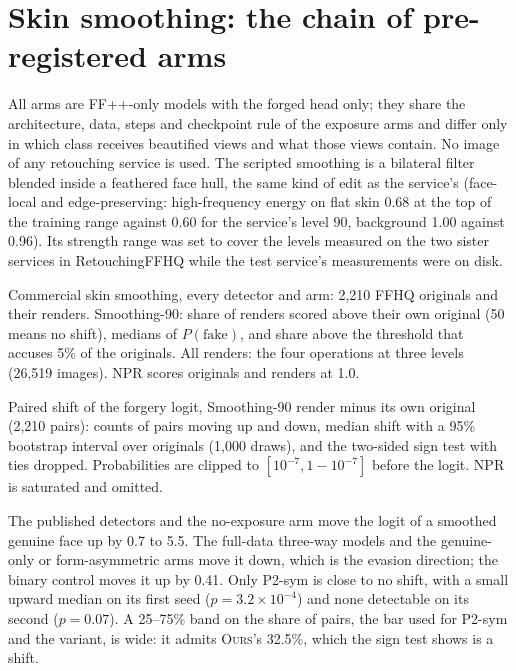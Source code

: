 \documentclass[10pt]{article}
\newcommand{\ours}{\textsc{Ours}}
\begin{document}
\section{Skin smoothing: the chain of pre-registered arms}
\label{sec:chain}
All arms are FF++-only models with the forged head only; they share the architecture, data, steps and checkpoint rule of the
exposure arms and differ only in which class receives beautified views and what those views contain. No image of any retouching
service is used. The scripted smoothing is a bilateral filter blended inside a feathered face hull, the same kind of edit as the
service's (face-local and edge-preserving: high-frequency energy on flat skin 0.68 at the top of the training range against 0.60
for the service's level 90, background 1.00 against 0.96). Its strength range was set to cover the levels measured on the two
sister services in RetouchingFFHQ while the test service's measurements were on disk.

\begin{table}[H]
\centering
\caption{Commercial skin smoothing, every detector and arm: 2,210 FFHQ originals and their renders. Smoothing-90: share of renders
scored above their own original (50 means no shift), medians of $P(\text{fake})$, and share above the threshold that accuses 5\% of
the originals. All renders: the four operations at three levels (26,519 images). NPR scores originals and renders at 1.0.}
\label{tab:v4retouch}
\scriptsize
\begin{adjustbox}{max width=\linewidth}\end{adjustbox}
\end{table}
\begin{table}[H]
\centering
\caption{Paired shift of the forgery logit, Smoothing-90 render minus its own original (2,210 pairs): counts of pairs moving up and
down, median shift with a 95\% bootstrap interval over originals (1,000 draws), and the two-sided sign test with ties dropped.
Probabilities are clipped to $[10^{-7}, 1-10^{-7}]$ before the logit. NPR is saturated and omitted.}
\label{tab:shiftall}
\footnotesize

\end{table}
The published detectors and the no-exposure arm move the logit of a smoothed genuine face up by 0.7 to 5.5. The full-data three-way
models and the genuine-only or form-asymmetric arms move it down, which is the evasion direction; the binary control moves it up by
0.41. Only P2-sym is close to no shift, with a small upward median on its first seed ($p=3.2\times10^{-4}$) and none detectable on
its second ($p=0.07$). A 25--75\% band on the share of pairs, the bar used for P2-sym and the variant, is wide: it admits \ours{}'s
32.5\%, which the sign test shows is a shift.
\end{document}
